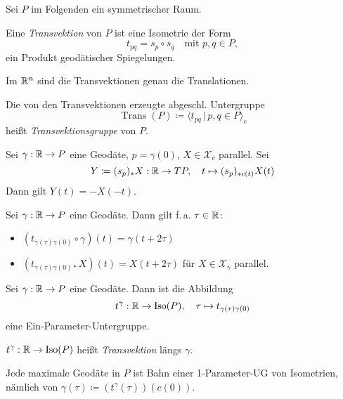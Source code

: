 \documentclass{cheat-sheet}
\DeclareMathOperator{\Iso}{Iso} %
\DeclareMathOperator{\Trans}{Trans} %
\newcommand{\VF}{\mathcal{X}} %
\begin{document}
\begin{nota}
  Sei $P$ im Folgenden ein symmetrischer Raum.
\end{nota}

\begin{defn}
  Eine \emph{Transvektion} von $P$ ist eine Isometrie der Form
  \[ t_{pq} = s_p \circ s_q \quad \text{mit } p, q \in P, \]
  \dh{} ein Produkt geodätischer Spiegelungen.
\end{defn}

\begin{bsp}
  Im $\mathbb{R}^n$ sind die Transvektionen genau die Translationen.
\end{bsp}

\begin{defn}
  Die von den Transvektionen erzeugte abgeschl. Untergruppe
  \[ \Trans(P) \coloneqq \langle t_{pq} \,|\, p, q \in P \rangle_{c} \]
  heißt \emph{Transvektionsgruppe} von $P$.
\end{defn}

\begin{lem}
  Sei $\gamma : \mathbb{R} \to P$ eine Geodäte, $p = \gamma(0)$, $X \in \VF_c$ parallel. Sei
  \[
    Y \coloneqq (s_p)_* X : \mathbb{R} \to TP, \quad
    t \mapsto (s_p)_{*c(t)} X(t)
  \]
  Dann gilt $Y(t) = -X(-t)$.
\end{lem}

\begin{lem}
  Sei $\gamma : \mathbb{R} \to P$ eine Geodäte. Dann gilt f.\,a. $\tau \in \mathbb{R}$:
  \begin{itemize}
    \item $(t_{\gamma(\tau)\gamma(0)} \circ \gamma)(t) = \gamma(t + 2\tau)$
    \item $(t_{\gamma(\tau)\gamma(0)*} X)(t) = X(t + 2 \tau)$ für $X \in \VF_\gamma$ parallel.
  \end{itemize}
\end{lem}

\begin{lem}
  Sei $\gamma : \mathbb{R} \to P$ eine Geodäte. Dann ist die Abbildung
  \[
    t^\gamma : \R \to \Iso(P), \quad
    \tau \mapsto t_{\gamma(\tau)\gamma(0)}
  \]
  eine Ein-Parameter-Untergruppe.
\end{lem}

\begin{defn}
  $t^\gamma : \R \to \Iso(P)$ heißt \emph{Transvektion} längs $\gamma$.
\end{defn}

\begin{satz}
  Jede maximale Geodäte in $P$ ist Bahn einer 1-Parameter-UG von Isometrien, nämlich von $\gamma(\tau) \coloneqq (t^\gamma(\tau))(c(0))$.
\end{satz}
\end{document}
